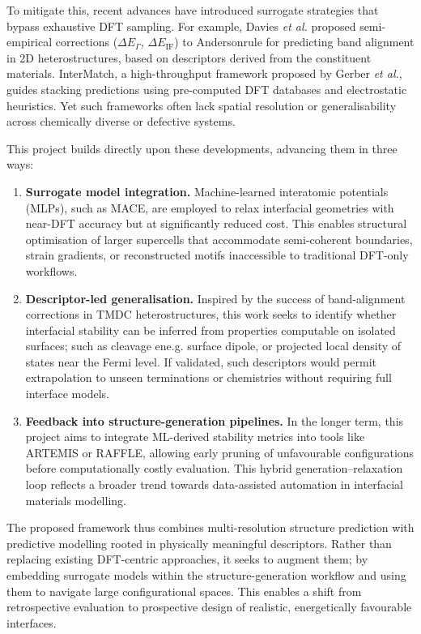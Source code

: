 To mitigate this, recent advances have introduced surrogate strategies that bypass exhaustive DFT sampling. For example, Davies \textit{et al.} proposed semi-empirical corrections (\(\Delta E_\Gamma\), \(\Delta E_{\mathrm{IF}}\)) to Anderson\rqss rule for predicting band alignment in 2D heterostructures, based on descriptors derived from the constituent materials. InterMatch, a high-throughput framework proposed by Gerber \textit{et al.}, guides stacking predictions using pre-computed DFT databases and electrostatic heuristics. Yet such frameworks often lack spatial resolution or generalisability across chemically diverse or defective systems.

This project builds directly upon these developments, advancing them in three ways:

\begin{enumerate}
   \item \textbf{Surrogate model integration.} Machine-learned interatomic potentials (MLPs), such as MACE, are employed to relax interfacial geometries with near-DFT accuracy but at significantly reduced cost. This enables structural optimisation of larger supercells that accommodate semi-coherent boundaries, strain gradients, or reconstructed motifs inaccessible to traditional DFT-only workflows.
   \item \textbf{Descriptor-led generalisation.} Inspired by the success of band-alignment corrections in TMDC heterostructures, this work seeks to identify whether interfacial stability can be inferred from properties computable on isolated surfaces; such as cleavage ene.g. surface dipole, or projected local density of states near the Fermi level. If validated, such descriptors would permit extrapolation to unseen terminations or chemistries without requiring full interface models.
   \item \textbf{Feedback into structure-generation pipelines.} In the longer term, this project aims to integrate ML-derived stability metrics into tools like \textsc{ARTEMIS} or \textsc{RAFFLE}, allowing early pruning of unfavourable configurations before computationally costly evaluation. This hybrid generation--relaxation loop reflects a broader trend towards data-assisted automation in interfacial materials modelling.
\end{enumerate}

The proposed framework thus combines multi-resolution structure prediction with predictive modelling rooted in physically meaningful descriptors. Rather than replacing existing DFT-centric approaches, it seeks to augment them; by embedding surrogate models within the structure-generation workflow and using them to navigate large configurational spaces. This enables a shift from retrospective evaluation to prospective design of realistic, energetically favourable interfaces.

